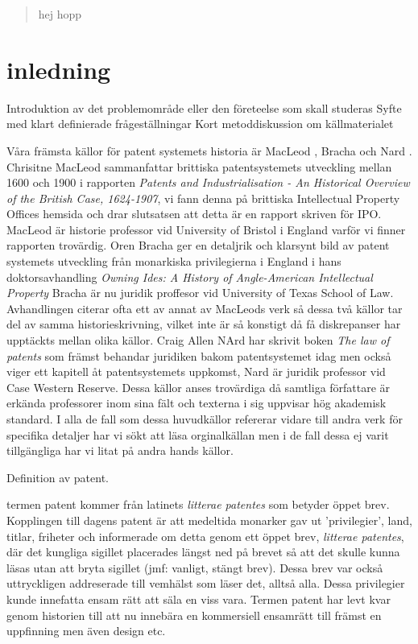 \begin{abstract}
	hej hopp
\end{abstract}	
	
	
\section{inledning}	
Introduktion av det problemområde eller den företeelse som skall studeras
Syfte med klart definierade frågeställningar
Kort metoddiskussion om källmaterialet

Våra främsta källor för patent systemets historia är MacLeod \cite{macleod}, Bracha \cite{bracha} och Nard \cite{nard}. Chrisitne MacLeod sammanfattar brittiska patentsystemets utveckling mellan 1600 och 1900 i rapporten \emph{Patents and Industrialisation - An Historical Overview of the British Case, 1624-1907}, vi fann denna på brittiska Intellectual Property Offices hemsida och drar slutsatsen att detta är en rapport skriven för IPO. MacLeod är historie professor vid University of Bristol i England varför vi finner rapporten trovärdig. Oren Bracha ger en detaljrik och klarsynt bild av patent systemets utveckling från monarkiska privilegierna i England i hans doktorsavhandling \emph{Owning Ides: A History of Angle-American Intellectual Property} Bracha är nu juridik proffesor vid University of Texas School of Law. Avhandlingen citerar ofta ett av annat av MacLeods verk så dessa två källor tar del av samma historieskrivning, vilket inte är så konstigt då få diskrepanser har upptäckts mellan olika källor. Craig Allen NArd har skrivit boken \emph{The law of patents} som främst behandar juridiken bakom patentsystemet idag men också viger ett kapitell åt patentsystemets uppkomst, Nard är juridik professor vid Case Western Reserve. Dessa källor anses trovärdiga då samtliga författare är erkända professorer inom sina fält och texterna i sig uppvisar hög akademisk standard. I alla de fall som dessa huvudkällor refererar vidare till andra verk för specifika detaljer har vi sökt att läsa orginalkällan men i de fall dessa ej varit tillgängliga har vi litat på andra hands källor.
  

Definition av patent.

termen patent kommer från latinets \emph{litterae patentes} som betyder öppet brev. Kopplingen till dagens patent är att medeltida monarker gav ut 'privilegier', land, titlar, friheter och informerade om detta genom ett öppet brev, \emph{litterae patentes}, där det kungliga sigillet placerades längst ned på brevet så att det skulle kunna läsas utan att bryta sigillet (jmf: vanligt, stängt brev). Dessa brev var också uttryckligen addreserade till vemhälst som läser det, alltså alla. Dessa privilegier kunde innefatta ensam rätt att säla en viss vara. Termen patent har levt kvar genom historien till att nu innebära en kommersiell ensamrätt till främst en uppfinning men även design etc. \cite{blackstone vad hänvisas?}


